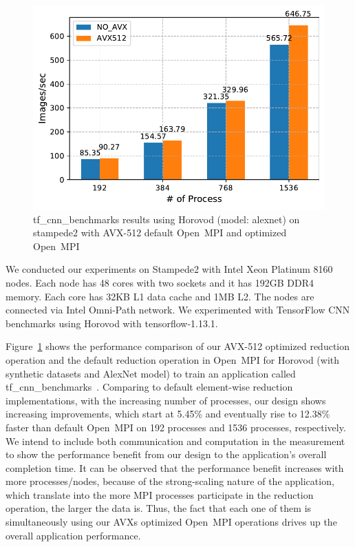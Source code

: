\documentclass[5p,times,twocolumn]{elsarticle}
\newcommand{\ompi}[0]{Open~MPI\xspace}
\begin{document}
\begin{figure}[h]
    \centering
    \includegraphics[width=\linewidth]{horovod_tacc.pdf}
    \caption{tf\_cnn\_benchmarks results using Horovod (model: alexnet) on stampede2
    with AVX-512 default \ompi and optimized \ompi}
    \label{fig:horovodtacc}
\end{figure}

We conducted our experiments on Stampede2 with Intel Xeon Platinum 8160 nodes. Each node has 48 cores with two sockets and it has 192GB DDR4 memory.
Each core has 32KB L1 data cache and 1MB L2. The nodes are connected via Intel Omni-Path network.
We experimented with TensorFlow CNN benchmarks using Horovod with tensorflow-1.13.1.

Figure~\ref{fig:horovodtacc} shows the performance comparison of
our AVX-512 optimized reduction operation and the default reduction operation in \ompi for Horovod (with synthetic datasets and AlexNet model) to train an application called tf\_cnn\_benchmarks~\cite{cnnTensorflow}.
Comparing to default element-wise reduction
implementations, with the increasing number of processes,
our design shows increasing improvements, which start at 5.45\% and
eventually rise to 12.38\% faster than default \ompi on 192 processes and 1536 processes, respectively.
We intend to include both communication and computation in the measurement to show the performance
benefit from our design to the application's overall completion time.
It can be observed that the performance benefit increases with more processes/nodes,
because of the strong-scaling nature of the application, which translate into the more
MPI processes participate in the reduction operation, the larger the data is.
Thus, the fact that each one of them is simultaneously using our AVXs optimized \ompi
operations drives up the overall application performance.
\end{document}
